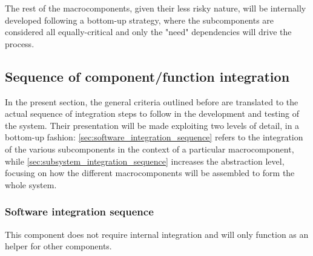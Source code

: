 	The rest of the macrocomponents, given their less risky nature, will be internally developed following a bottom-up strategy, where the subcomponents are considered all equally-critical and only the "need" dependencies will drive the process.
\FloatBarrier

\subsection{Sequence of component/function integration}
	In the present section, the general criteria outlined before are translated to the actual sequence of integration steps to follow in the development and testing of the system. Their presentation will be made exploiting two levels of detail, in a bottom-up fashion: \autoref{sec:software_integration_sequence} refers to the integration of the various subcomponents in the context of a particular macrocomponent, while \autoref{sec:subsystem_integration_sequence} increases the abstraction level, focusing on how the different macrocomponents will be assembled to form the whole system.

	\subsubsection{Software integration sequence}
	\label{sec:software_integration_sequence}
			This component does not require internal integration and will only function as an helper for other components.

